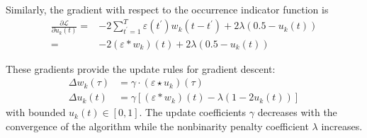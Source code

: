 \documentclass[10pt,twocolumn]{article}
\begin{document}
Similarly, the gradient with respect to the occurrence indicator function is
\begin{equation}
\begin{split}
\frac{\partial \mathcal L}{\partial u_k(t)} 
= & 
-2 \sum\limits_{t^\prime=1}^T \varepsilon(t^\prime) w_k(t-t^\prime) 
+ 2\lambda(0.5-u_k(t))
\\
= &
-2 (\varepsilon*w_k)(t) 
+ 2\lambda(0.5-u_k(t))
\end{split}
\end{equation}

These gradients provide the update rules for gradient descent: 
\begin{align}
\Delta w_k(\tau) &= \gamma\cdot(\varepsilon \star u_k)(\tau)
\\
\Delta u_k(t) &= \gamma\left[(\varepsilon * w_k)(t)
- \lambda (1-2u_k(t))\right]
\end{align}
with bounded $u_k(t)\in [0,1]$.
The update coefficients $\gamma$ decreases with the convergence of the algorithm while the nonbinarity penalty coefficient $\lambda$  increases.



\end{document}
